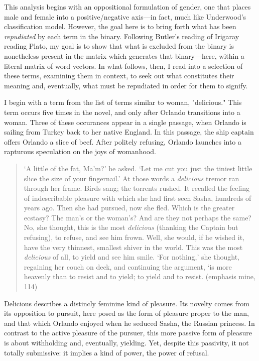 \documentclass[11pt]{article}
\begin{document}
This analysis begins with an oppositional formulation of gender, one
that places male and female into a positive/negative axis---in fact,
much like Underwood's classification model. However, the goal here is
to bring forth what has been \emph{repudiated} by each term in the binary.
Following Butler's reading of Irigaray reading Plato, my goal is to
show that what is excluded from the binary is nonetheless present in
the matrix which generates that binary---here, within a literal matrix
of word vectors. In what follows, then, I read into a selection of
these terms, examining them in context, to seek out what constitutes
their meaning and, eventually, what must be repudiated in order for
them to signify.

I begin with a term from the list of terms similar to woman,
"delicious." This term occurs five times in the novel, and only after
Orlando transitions into a woman. Three of these occurances appear in
a single passage, when Orlando is sailing from Turkey back to her
native England. In this passage, the ship captain offers Orlando a
slice of beef. After politely refusing, Orlando launches into a
rapturous speculation on the joys of womanhood.
\begin{quote}
‘A little of the fat, Ma’m?’ he asked. ‘Let me cut you just the
tiniest little slice the size of your fingernail.’ At those words a
\emph{delicious} tremor ran through her frame. Birds sang; the torrents
rushed. It recalled the feeling of indescribable pleasure with which
she had first seen Sasha, hundreds of years ago. Then she had pursued,
now she fled. Which is the greater ecstasy? The man’s or the woman’s?
And are they not perhaps the same? No, she thought, this is the most
\emph{delicious} (thanking the Captain but refusing), to refuse, and see
him frown. Well, she would, if he wished it, have the very thinnest,
smallest shiver in the world. This was the most \emph{delicious} of all, to
yield and see him smile. ‘For nothing,’ she thought, regaining her
couch on deck, and continuing the argument, ‘is more heavenly than to
resist and to yield; to yield and to resist. (emphasis mine, 114)
\end{quote}
Delicious describes a distincly feminine kind of pleasure. Its novelty
comes from its opposition to pursuit, here posed as the form of
pleasure proper to the man, and that which Orlando enjoyed when he
seduced Sasha, the Russian princess. In contrast to the active
pleasure of the pursuer, this more passive form of pleasure is about
withholding and, eventually, yielding. Yet, despite this passivity, it
not totally submissive: it implies a kind of power, the power of
refusal.
\end{document}
